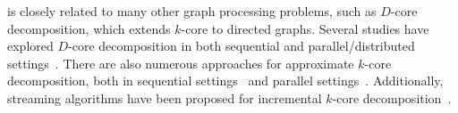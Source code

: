 \kcore{} is closely related to many other graph processing problems,
such as $D$-core decomposition, which extends $k$-core to directed graphs.
Several studies have explored $D$-core decomposition in both sequential and parallel/distributed settings~\cite{luo2024efficient, liao2022distributed, giatsidis2013d}.
There are also numerous approaches for approximate $k$-core decomposition, both in sequential settings~\cite{king2022computing} 
and parallel settings~\cite{esfandiari2018parallel,liu2022parallel, liu2024parallel, dhulipala2022differential}.
Additionally, streaming algorithms have been proposed for incremental $k$-core decomposition~\cite{sariyuce2013streaming, esfandiari2018parallel, sariyuce2016incremental}.



























